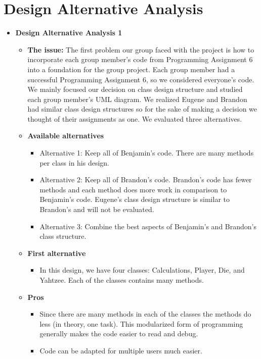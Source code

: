 \documentclass[]{report}   %
\begin{document}
\section{Design Alternative Analysis}     %
\begin{itemize}
\item \textbf{Design Alternative Analysis 1}
	\begin{itemize}
	\item \textbf{The issue:} The first problem our group faced with the project is how to incorporate each group member's code from Programming Assignment 6 into a foundation for the group project. Each group member had a successful Programming Assignment 6, so we considered everyone's code. We mainly focused our decision on class design structure and studied each group member's UML diagram. We realized Eugene and Brandon had similar class design structures so for the sake of making a decision we thought of their assignments as one. We evaluated three alternatives.
	\item \textbf{Available alternatives}
		\begin{itemize}
		\item Alternative 1: Keep all of Benjamin's code. There are many methods per class in his design.
		\item Alternative 2: Keep all of Brandon's code. Brandon's code has fewer methods and each method does more work in comparison to Benjamin's code. Eugene's class design structure is similar to Brandon's and will not be evaluated.
		\item Alternative 3: Combine the best aspects of Benjamin's and Brandon's class structure.
		\end{itemize}
	\item \textbf{First alternative}
		\begin{itemize}
		\item In this design, we have four classes: Calculations, Player, Die, and Yahtzee. Each of the classes contains many methods.
		\end{itemize}
	\item \textbf{Pros}
		\begin{itemize}
		\item Since there are many methods in each of the classes the methods do less (in theory, one task). This modularized form of programming generally makes the code easier to read and debug. 
		\item Code can be adapted for multiple users much easier.


\end{itemize}
\end{itemize}
\end{itemize}
\end{document}
